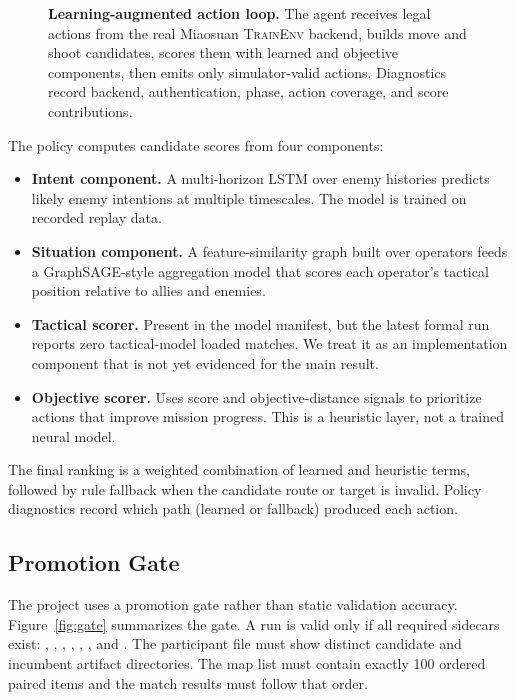 \documentclass{article}
\newcommand{\env}{\textsc{TrainEnv}}
\begin{document}
\begin{figure}[t]
  \centering
  
  \caption{\textbf{Learning-augmented action loop.} The agent receives legal actions from the real Miaosuan \env{} backend, builds move and shoot candidates, scores them with learned and objective components, then emits only simulator-valid actions. Diagnostics record backend, authentication, phase, action coverage, and score contributions.}
  \label{fig:architecture}
\end{figure}

The policy computes candidate scores from four components:

\begin{itemize}
  \item \textbf{Intent component.} A multi-horizon LSTM \citep{hochreiter1997lstm} over enemy histories predicts likely enemy intentions at multiple timescales. The model is trained on recorded replay data.
  \item \textbf{Situation component.} A feature-similarity graph built over operators feeds a GraphSAGE-style aggregation model \citep{hamilton2018graphsage} that scores each operator's tactical position relative to allies and enemies.
  \item \textbf{Tactical scorer.} Present in the model manifest, but the latest formal run reports zero tactical-model loaded matches. We treat it as an implementation component that is not yet evidenced for the main result.
  \item \textbf{Objective scorer.} Uses score and objective-distance signals to prioritize actions that improve mission progress. This is a heuristic layer, not a trained neural model.
\end{itemize}

The final ranking is a weighted combination of learned and heuristic terms, followed by rule fallback when the candidate route or target is invalid. Policy diagnostics record which path (learned or fallback) produced each action.

\subsection{Promotion Gate}

The project uses a promotion gate rather than static validation accuracy. Figure~\ref{fig:gate} summarizes the gate. A run is valid only if all required sidecars exist: , , , , , , and . The participant file must show distinct candidate and incumbent artifact directories. The map list must contain exactly 100 ordered paired items and the match results must follow that order.
\end{document}
